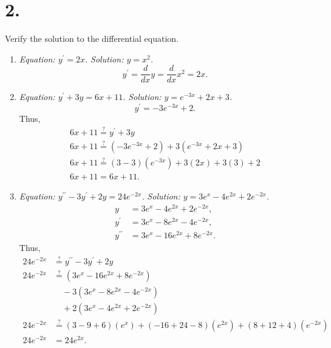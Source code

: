 \documentclass[12pt]{article}
\begin{document}
\section*{2.}
Verify the solution to the differential equation.
\begin{enumerate}[label=(\alph*)]
	\item
	\textit{Equation: $y^\prime = 2x$.}
	\textit{Solution: $y = x^2$.}
	\begin{equation*}
		y^\prime = \frac{d}{dx} y = \frac{d}{dx} x^2 = 2x.
	\end{equation*}
	\newpage
	
	\item
	\textit{Equation: $y^\prime + 3y = 6x + 11$.}
	\textit{Solution: $y = e^{-3x} + 2x + 3$.}
	\begin{equation*}
		y^\prime = -3e^{-3x} + 2.
	\end{equation*}
	Thus,
	\begin{gather*}
		6x + 11 \overset{?}{=} y^\prime + 3y \\
		6x + 11 \overset{?}{=} (-3e^{-3x} + 2) + 3(e^{-3x} + 2x + 3) \\
		6x + 11 \overset{?}{=} (3 - 3)(e^{-3x}) + 3(2x) + 3(3) + 2 \\
		6x + 11 = 6x + 11.
	\end{gather*}
	
	\item
	\textit{Equation: $y^{\prime\prime} - 3y^\prime + 2y = 24e^{-2x}$.}
	\textit{Solution: $y = 3e^x - 4e^{2x} + 2e^{-2x}$.}
	\begin{align*}
		y &= 3e^x - 4e^{2x} + 2e^{-2x}, \\
		y^\prime &= 3e^x - 8e^{2x} - 4e^{-2x}, \\
		y^{\prime\prime} &= 3e^x - 16e^{2x} + 8e^{-2x}.
	\end{align*}
	Thus,
	\begin{align*}
		24e^{-2x} &\overset{?}{=} y^{\prime\prime} - 3y^\prime + 2y \\
		24e^{-2x} &\overset{?}{=}
		(3e^x - 16e^{2x} + 8e^{-2x}) \\
		&\quad - 3(3e^x - 8e^{2x} - 4e^{-2x}) \\
		&\quad + 2(3e^x - 4e^{2x} + 2e^{-2x}) \\
		24e^{-2x} &\overset{?}{=}
		(3 - 9 + 6)(e^x) + (-16 + 24 - 8)(e^{2x}) + (8 + 12 + 4)(e^{-2x}) \\
		24e^{-2x} &= 24e^{2x}.
	\end{align*}
\end{enumerate}
\end{document}

